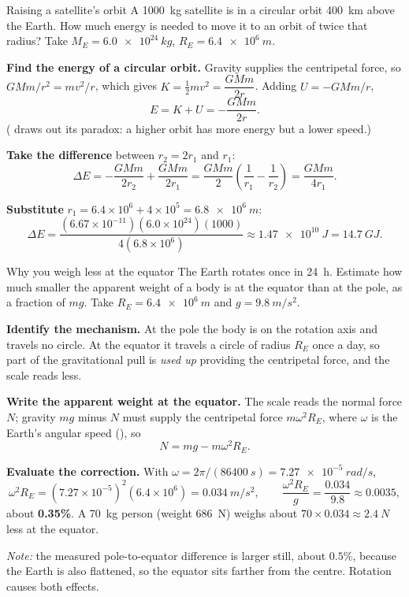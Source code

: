 \begin{exbox}{Raising a satellite's orbit}
A \SI{1000}{kg} satellite is in a circular orbit \SI{400}{km} above the Earth. How much energy is
needed to move it to an orbit of twice that radius? Take $M_E=\SI{6.0e24}{kg}$,
$R_E=\SI{6.4e6}{m}$.

 \textbf{Find the energy of a circular orbit.} Gravity supplies the centripetal force, so
$GMm/r^{2}=mv^{2}/r$, which gives $K=\tfrac12mv^{2}=\dfrac{GMm}{2r}$. Adding $U=-GMm/r$,
\[
E=K+U=-\frac{GMm}{2r}.
\]
( draws out its paradox: a higher orbit has more energy but a lower speed.)

 \textbf{Take the difference} between $r_2=2r_1$ and $r_1$:
\[
\Delta E=-\frac{GMm}{2r_2}+\frac{GMm}{2r_1}
=\frac{GMm}{2}\left(\frac{1}{r_1}-\frac{1}{r_2}\right)
=\frac{GMm}{4r_1}.
\]

 \textbf{Substitute} $r_1=6.4\times10^{6}+4\times10^{5}=\SI{6.8e6}{m}$:
\[
\Delta E=\frac{(6.67\times10^{-11})(6.0\times10^{24})(1000)}{4(6.8\times10^{6})}
\approx\SI{1.47e10}{J}=\SI{14.7}{GJ}.
\]
\end{exbox}

\begin{exbox}{Why you weigh less at the equator}
The Earth rotates once in \SI{24}{h}. Estimate how much smaller the apparent weight of a body is at the
equator than at the pole, as a fraction of $mg$. Take $R_E=\SI{6.4e6}{m}$ and $g=\SI{9.8}{m/s^2}$.

 \textbf{Identify the mechanism.} At the pole the body is on the rotation axis and travels no
circle. At the equator it travels a circle of radius $R_E$ once a day, so part of the gravitational
pull is \emph{used up} providing the centripetal force, and the scale reads less.

 \textbf{Write the apparent weight at the equator.} The scale reads the normal force $N$;
gravity $mg$ minus $N$ must supply the centripetal force $m\omega^2R_E$, where $\omega$ is the
Earth's angular speed (), so
\[
N=mg-m\omega^{2}R_E .
\]

 \textbf{Evaluate the correction.} With
$\omega=2\pi/(\SI{86400}{s})=\SI{7.27e-5}{rad/s}$,
\[
\omega^{2}R_E=(7.27\times10^{-5})^{2}(6.4\times10^{6})=\SI{0.034}{m/s^2},
\qquad
\frac{\omega^{2}R_E}{g}=\frac{0.034}{9.8}\approx0.0035,
\]
about \textbf{0.35\%}. A \SI{70}{kg} person (weight \SI{686}{N}) weighs about
$70\times0.034\approx\SI{2.4}{N}$ less at the equator.

\smallskip
\emph{Note:} the measured pole-to-equator difference is larger still, about $0.5\%$, because the Earth
is also flattened, so the equator sits farther from the centre. Rotation causes both effects.
\end{exbox}


